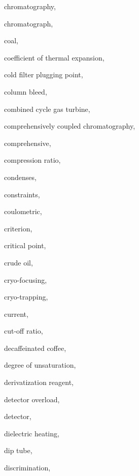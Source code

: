 \begin{theindex}
  \item \lowercase {chromatography}, 
  \item \lowercase {chromatograph}, 
  \item \lowercase {coal}, 
  \item \lowercase {coefficient of thermal expansion}, 
  \item \lowercase {cold filter plugging point}, 
  \item \lowercase {column bleed}, 
  \item \lowercase {combined cycle gas turbine}, 
  \item \lowercase {comprehensively coupled chromatography}, 
  \item \lowercase {comprehensive}, 
  \item \lowercase {compression ratio}, 
  \item \lowercase {condenses}, 
  \item \lowercase {constraints}, 
  \item \lowercase {coulometric}, 
  \item \lowercase {criterion}, 
  \item \lowercase {critical point}, 
  \item \lowercase {crude oil}, 
  \item \lowercase {cryo-focusing}, 
  \item \lowercase {cryo-trapping}, 
  \item \lowercase {current}, 
  \item \lowercase {cut-off ratio}, 
  \item \lowercase {decaffeinated coffee}, 
  \item \lowercase {degree of unsaturation}, 
  \item \lowercase {derivatization reagent}, 
  \item \lowercase {detector overload}, 
  \item \lowercase {detector}, 
  \item \lowercase {dielectric heating}, 
  \item \lowercase {dip tube}, 
  \item \lowercase {discrimination}, 

\end{theindex}
